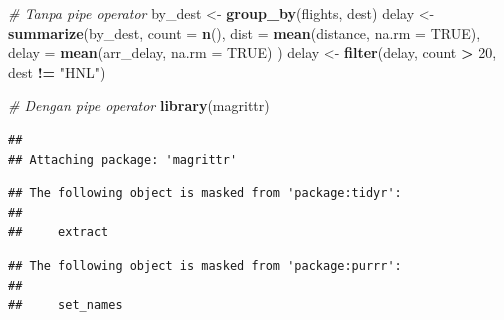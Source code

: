 \documentclass[]{book}
\newenvironment{Shaded}{\begin{snugshade}}{\end{snugshade}}
\newcommand{\KeywordTok}[1]{\textcolor[rgb]{0.13,0.29,0.53}{\textbf{#1}}}
\newcommand{\DataTypeTok}[1]{\textcolor[rgb]{0.13,0.29,0.53}{#1}}
\newcommand{\DecValTok}[1]{\textcolor[rgb]{0.00,0.00,0.81}{#1}}
\newcommand{\StringTok}[1]{\textcolor[rgb]{0.31,0.60,0.02}{#1}}
\newcommand{\CommentTok}[1]{\textcolor[rgb]{0.56,0.35,0.01}{\textit{#1}}}
\newcommand{\OtherTok}[1]{\textcolor[rgb]{0.56,0.35,0.01}{#1}}
\newcommand{\OperatorTok}[1]{\textcolor[rgb]{0.81,0.36,0.00}{\textbf{#1}}}
\newcommand{\NormalTok}[1]{#1}
\begin{document}
\begin{Shaded}
\begin{Highlighting}[]
\CommentTok{# Tanpa pipe operator}
\NormalTok{by_dest <-}\StringTok{ }\KeywordTok{group_by}\NormalTok{(flights, dest)}
\NormalTok{delay <-}\StringTok{ }\KeywordTok{summarize}\NormalTok{(by_dest,}
  \DataTypeTok{count =} \KeywordTok{n}\NormalTok{(),}
  \DataTypeTok{dist =} \KeywordTok{mean}\NormalTok{(distance, }\DataTypeTok{na.rm =} \OtherTok{TRUE}\NormalTok{),}
  \DataTypeTok{delay =} \KeywordTok{mean}\NormalTok{(arr_delay, }\DataTypeTok{na.rm =} \OtherTok{TRUE}\NormalTok{)}
\NormalTok{)}
\NormalTok{delay <-}\StringTok{ }\KeywordTok{filter}\NormalTok{(delay, count }\OperatorTok{>}\StringTok{ }\DecValTok{20}\NormalTok{, dest }\OperatorTok{!=}\StringTok{ "HNL"}\NormalTok{)}

\CommentTok{# Dengan pipe operator}
\KeywordTok{library}\NormalTok{(magrittr)}
\end{Highlighting}
\end{Shaded}

\begin{verbatim}
## 
## Attaching package: 'magrittr'
\end{verbatim}

\begin{verbatim}
## The following object is masked from 'package:tidyr':
## 
##     extract
\end{verbatim}

\begin{verbatim}
## The following object is masked from 'package:purrr':
## 
##     set_names
\end{verbatim}

\begin{Shaded}
\end{Shaded}
\end{document}
